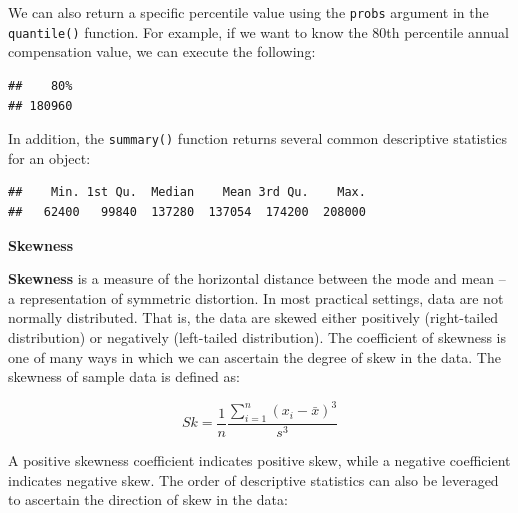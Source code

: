 \documentclass[]{book}
\newenvironment{Shaded}{\begin{snugshade}}{\end{snugshade}}
\newcommand{\CommentTok}[1]{\textcolor[rgb]{0.56,0.35,0.01}{\textit{#1}}}
\newcommand{\DataTypeTok}[1]{\textcolor[rgb]{0.13,0.29,0.53}{#1}}
\newcommand{\FloatTok}[1]{\textcolor[rgb]{0.00,0.00,0.81}{#1}}
\newcommand{\KeywordTok}[1]{\textcolor[rgb]{0.13,0.29,0.53}{\textbf{#1}}}
\newcommand{\NormalTok}[1]{#1}
\newcommand{\OperatorTok}[1]{\textcolor[rgb]{0.81,0.36,0.00}{\textbf{#1}}}
\begin{document}
We can also return a specific percentile value using the \texttt{probs} argument in the \texttt{quantile()} function. For example, if we want to know the 80th percentile annual compensation value, we can execute the following:

\begin{Shaded}
\end{Shaded}

\begin{verbatim}
##    80% 
## 180960
\end{verbatim}

In addition, the \texttt{summary()} function returns several common descriptive statistics for an object:

\begin{Shaded}
\end{Shaded}

\begin{verbatim}
##    Min. 1st Qu.  Median    Mean 3rd Qu.    Max. 
##   62400   99840  137280  137054  174200  208000
\end{verbatim}

\textbf{Skewness}

\textbf{Skewness} is a measure of the horizontal distance between the mode and mean -- a representation of symmetric distortion. In most practical settings, data are not normally distributed. That is, the data are skewed either positively (right-tailed distribution) or negatively (left-tailed distribution). The coefficient of skewness is one of many ways in which we can ascertain the degree of skew in the data. The skewness of sample data is defined as:

\[ Sk = \frac{1}{n} \frac{\displaystyle\sum_{i=1}^{n} (x_i-\bar{x})^3}{s^3} \]

A positive skewness coefficient indicates positive skew, while a negative coefficient indicates negative skew. The order of descriptive statistics can also be leveraged to ascertain the direction of skew in the data:
\end{document}
